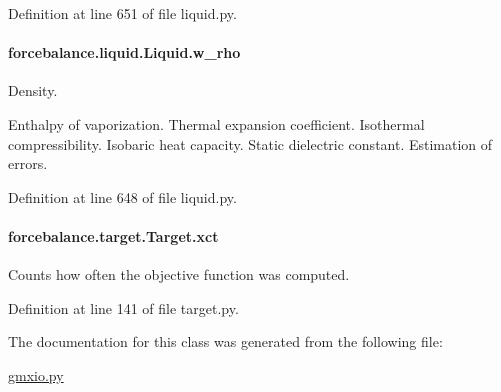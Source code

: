 Definition at line 651 of file liquid.\-py.

\hypertarget{classforcebalance_1_1liquid_1_1Liquid_aef8ad1dda086bde6f48130d273af9784}{
\paragraph[{w\-\_\-rho}]{\setlength{\rightskip}{0pt plus 5cm}forcebalance.\-liquid.\-Liquid.\-w\-\_\-rho\hspace{0.3cm}{\ttfamily [inherited]}}}\label{classforcebalance_1_1liquid_1_1Liquid_aef8ad1dda086bde6f48130d273af9784}


Density. 

Enthalpy of vaporization. Thermal expansion coefficient. Isothermal compressibility. Isobaric heat capacity. Static dielectric constant. Estimation of errors. 

Definition at line 648 of file liquid.\-py.

\hypertarget{classforcebalance_1_1target_1_1Target_aad2e385cfbf7b4a68f1c2cb41133fe82}{
\paragraph[{xct}]{\setlength{\rightskip}{0pt plus 5cm}forcebalance.\-target.\-Target.\-xct\hspace{0.3cm}{\ttfamily [inherited]}}}\label{classforcebalance_1_1target_1_1Target_aad2e385cfbf7b4a68f1c2cb41133fe82}


Counts how often the objective function was computed. 



Definition at line 141 of file target.\-py.



The documentation for this class was generated from the following file\-:\begin{DoxyCompactItemize}
\item 
\hyperlink{gmxio_8py}{gmxio.\-py}\end{DoxyCompactItemize}
